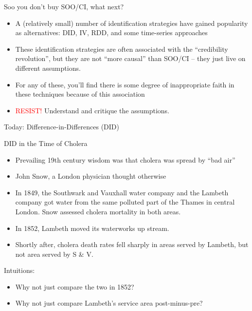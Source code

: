 \documentclass[xcolor=dvipsnames]{beamer}
\begin{document}
\begin{frame}{Soo you don't buy SOO/CI, what next?}
\small
\begin{itemize}
\item<1-> A (relatively small) number of identification strategies have gained popularity as alternatives: DID, IV, RDD, and some time-series approaches
\item<2-> These identification strategies are often associated with the ``credibility revolution'', but they are not ``more causal'' than SOO/CI -- they just live on different assumptions. 
\item<3-> For any of these, you'll find there is some degree of inappropriate faith in these techniques because of this association
\item<4-> \textcolor{Red}{RESIST!} Understand and critique the assumptions. 
\end{itemize}
\large
\begin{center}
Today: Difference-in-Differences (DID)
\end{center}
\end{frame}

\begin{frame}{DID in the Time of Cholera}
\small
\begin{itemize}
\item Prevailing 19th century wisdom was that cholera was spread by ``bad air''
\smallskip 
\item John Snow, a London physician thought otherwise
\smallskip
\item In 1849, the Southwark and Vauxhall water company and the Lambeth company got water from the same polluted part of the Thames in central London. Snow assessed cholera mortality in both areas. \smallskip
\item In 1852, Lambeth moved its waterworks up stream.
\smallskip
\item Shortly after, cholera death rates fell sharply in areas served by Lambeth, but not area served by S \& V. 
\end{itemize}
\bigskip
{} Intuitions:
\begin{itemize}
\item<3-> Why not just compare the two in 1852?
\item<4-> Why not just compare Lambeth's service area post-minus-pre? 
\end{itemize}
\end{frame}


\end{document}
